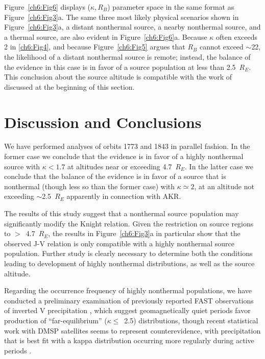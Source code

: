   Figure~\ref{ch6:Fig6} displays ($\kappa, R_B$) parameter space in the same
  format as Figure~\ref{ch6:Fig3}a. The same three most likely physical
  scenarios shown in Figure~\ref{ch6:Fig3}a, a distant nonthermal source, a
  nearby nonthermal source, and a thermal source, are also evident in
  Figure~\ref{ch6:Fig6}a. Because $\kappa$ often exceeds 2 in \ref{ch6:Fig4},
  and because Figure~\ref{ch6:Fig5} argues that $R_B$ cannot exceed $\sim$22,
  the likelihood of a distant nonthermal source is remote; instead, the balance
  of the evidence in this case is in favor of a source population at less than
  2.5~$R_E$. This conclusion about the source altitude is compatible with the
  work of \citet{Ergun1998} discussed at the beginning of this section.


  \section{Discussion and Conclusions}

  We have performed analyses of orbits 1773 and 1843 in parallel
  fashion. In the former case we conclude that the evidence is in
  favor of a highly nonthermal source with $\kappa < 1.7$ at altitudes
  near or exceeding 4.7~$R_E$. In the latter case we conclude that the
  balance of the evidence is in favor of a source that is nonthermal
  (though less so than the former case) with $\kappa \simeq 2$, at an
  altitude not exceeding $\sim$2.5~$R_E$ apparently in connection with
  AKR.

  The results of this study suggest that a nonthermal source
  population may significantly modify the Knight relation. Given the
  restriction on source regions to $>$~4.7~$R_E$, the results in
  Figure~\ref{ch6:Fig3}a in particular show that the observed J-V
  relation is only compatible with a highly nonthermal source
  population. Further study is clearly necessary to determine both the
  conditions leading to development of highly nonthermal
  distributions, as well as the source altitude.

  Regarding the occurrence frequency of highly nonthermal populations,
  we have conducted a preliminary examination of previously reported
  FAST observations of inverted V precipitation
  \citep{McFadden1998a,Carlson2001,Janhunen2001,Dombeck2013}, which
  suggest geomagnetically quiet periods favor production of
  ``far-equilibrium'' ($\kappa \leq$~2.5) distributions, though recent
  statistical work with DMSP satellites seems to represent
  counterevidence, with precipitation that is best fit with a kappa
  distribution occurring more regularly during active periods
  \citep[e.g., Figure~7 in][]{McIntosh2014}.

